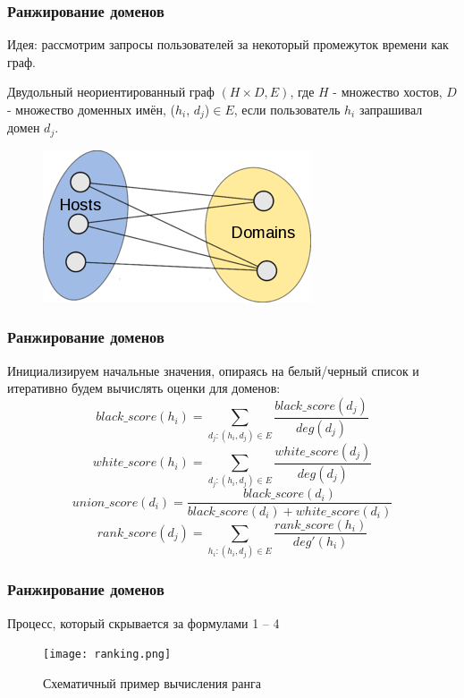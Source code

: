 \documentclass[12pt,pdf,hyperref={unicode}]{beamer}
\begin{document}
\begin{frame}
\frametitle{Ранжирование доменов}
Идея: рассмотрим запросы пользователей за некоторый промежуток времени как граф.
\newline
\begin{definition}Двудольный неориентированный граф $(H\times D,  E)$, 
где $H$ - множество хостов, $D$ - множество доменных имён, ($h_i$, $d_j$)$\in$$E$, если пользователь $h_i$ запрашивал домен $d_j$. 
\end{definition}

\begin{figure}[H]
	\centering
	\includegraphics[scale=2.]{b_graph.png}
\end{figure}
\end{frame}


\begin{frame}
\frametitle{Ранжирование доменов}
Инициализируем начальные значения, опираясь на белый/черный список и итеративно будем вычислять оценки для доменов:
\begin{equation}
	\label{eq:dr1-black}
	black\_score(h_i) = \sum_{d_j: (h_i, d_j)\in E} \frac{black\_score(d_j)}{deg(d_j)}
\end{equation}
\begin{equation}
	\label{eq:dr1-white}
	white\_score(h_i) = \sum_{d_j: (h_i, d_j)\in E} \frac{white\_score(d_j)}{deg(d_j)}
\end{equation}
\begin{equation}
	\label{eq:dr1-union}
	union\_score(d_i) = \frac{black\_score(d_i)}{black\_score(d_i) + white\_score(d_i)}
\end{equation}
\begin{equation}
	\label{eq:dr2-rank}
	rank\_score(d_j) = \sum_{h_i: (h_i, d_j)\in E} \frac{rank\_score(h_i)}{deg'(h_i)}
\end{equation}
\end{frame}


\begin{frame}
\frametitle{Ранжирование доменов}
Процесс, который скрывается за формулами 1 -- 4
\begin{figure}[H]
	\centering
	\texttt{[image: ranking.png]}
	\caption{Схематичный пример вычисления ранга}
\end{figure}
\end{frame}
\end{document}
